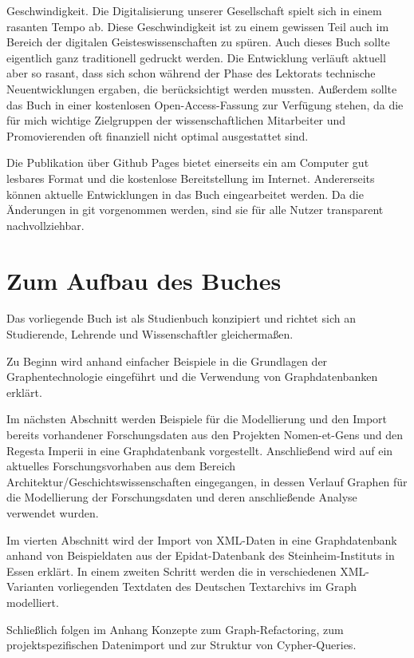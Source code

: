 \documentclass[ngerman,]{scrreprt}
\begin{document}
Geschwindigkeit. Die Digitalisierung unserer Gesellschaft spielt sich in einem rasanten Tempo ab. Diese Geschwindigkeit ist zu einem gewissen Teil auch im Bereich der digitalen Geisteswissenschaften zu spüren. Auch dieses Buch sollte eigentlich ganz traditionell gedruckt werden. Die Entwicklung verläuft aktuell aber so rasant, dass sich schon während der Phase des Lektorats technische Neuentwicklungen ergaben, die berücksichtigt werden mussten. Außerdem sollte das Buch in einer kostenlosen Open-Access-Fassung zur Verfügung stehen, da die für mich wichtige Zielgruppen der wissenschaftlichen Mitarbeiter und Promovierenden oft finanziell nicht optimal ausgestattet sind.

Die Publikation über Github Pages bietet einerseits ein am Computer gut lesbares Format und die kostenlose Bereitstellung im Internet. Andererseits können aktuelle Entwicklungen in das Buch eingearbeitet werden. Da die Änderungen in git vorgenommen werden, sind sie für alle Nutzer transparent nachvollziehbar.

\hypertarget{zum-aufbau-des-buches}{%
\section{Zum Aufbau des Buches}\label{zum-aufbau-des-buches}}

Das vorliegende Buch ist als Studienbuch konzipiert und richtet sich an Studierende, Lehrende und Wissenschaftler gleichermaßen.

Zu Beginn wird anhand einfacher Beispiele in die Grundlagen der Graphentechnologie eingeführt und die Verwendung von Graphdatenbanken erklärt.

Im nächsten Abschnitt werden Beispiele für die Modellierung und den Import bereits vorhandener Forschungsdaten aus den Projekten Nomen-et-Gens und den Regesta Imperii in eine Graphdatenbank vorgestellt. Anschließend wird auf ein aktuelles Forschungsvorhaben aus dem Bereich Architektur/Geschichtswissenschaften eingegangen, in dessen Verlauf Graphen für die Modellierung der Forschungsdaten und deren anschließende Analyse verwendet wurden.

Im vierten Abschnitt wird der Import von XML-Daten in eine Graphdatenbank anhand von Beispieldaten aus der Epidat-Datenbank des Steinheim-Instituts in Essen erklärt. In einem zweiten Schritt werden die in verschiedenen XML-Varianten vorliegenden Textdaten des Deutschen Textarchivs im Graph modelliert.

Schließlich folgen im Anhang Konzepte zum Graph-Refactoring, zum projektspezifischen Datenimport und zur Struktur von Cypher-Queries.
\end{document}
